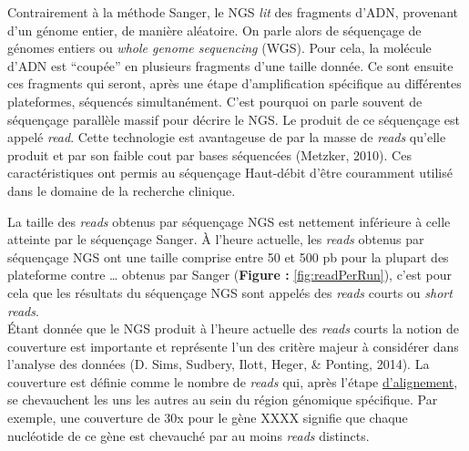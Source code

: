 \documentclass[12pt,twoside]{reedthesis}
\theoremstyle{definition}
\theoremstyle{definition}
\theoremstyle{remark}
\begin{document}
  Contrairement à la méthode Sanger, le NGS \emph{lit} des fragments
  d'ADN, provenant d'un génome entier, de manière aléatoire. On parle
  alors de séquençage de génomes entiers ou \emph{whole genome sequencing}
  (WGS). Pour cela, la molécule d'ADN est ``coupée'' en plusieurs
  fragments d'une taille donnée. Ce sont ensuite ces fragments qui seront,
  après une étape d'amplification spécifique au différentes plateformes,
  séquencés simultanément. C'est pourquoi on parle souvent de séquençage
  parallèle massif pour décrire le NGS. Le produit de ce séquençage est
  appelé \emph{read}. Cette technologie est avantageuse de par la masse de
  \emph{reads} qu'elle produit et par son faible cout par bases séquencées
  (Metzker, 2010). Ces caractéristiques ont permis au séquençage
  Haut-débit d'être couramment utilisé dans le domaine de la recherche
  clinique.
  
  La taille des \emph{reads} obtenus par séquençage NGS est nettement
  inférieure à celle atteinte par le séquençage Sanger. À l'heure
  actuelle, les \emph{reads} obtenus par séquençage NGS ont une taille
  comprise entre 50 et 500 pb pour la plupart des plateforme contre
  \ldots{} obtenus par Sanger (\textbf{Figure :} \ref{fig:readPerRun}),
  c'est pour cela que les résultats du séquençage NGS sont appelés des
  \emph{reads} courts ou \emph{short reads}.\\
  Étant donnée que le NGS produit à l'heure actuelle des \emph{reads}
  courts la notion de couverture est importante et représente l'un des
  critère majeur à considérer dans l'analyse des données (D. Sims,
  Sudbery, Ilott, Heger, \& Ponting, 2014). La couverture est définie
  comme le nombre de \emph{reads} qui, après l'étape
  \protect\hyperlink{lalignement}{d'alignement}, se chevauchent les uns
  les autres au sein du région génomique spécifique. Par exemple, une
  couverture de 30x pour le gène XXXX signifie que chaque nucléotide de ce
  gène est chevauché par au moins \emph{reads} distincts.
  
\end{document}
